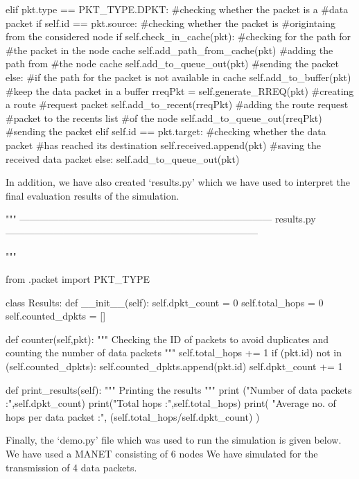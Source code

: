 \documentclass[a4paper,11pt]{article}%
\begin{document}
\begin{python}
		 elif pkt.type == PKT_TYPE.DPKT:  #checking whether the packet is a
																			#data packet
				 if self.id == pkt.source:    #checking whether the packet is
																			#origintaing from the considered node
						 if self.check_in_cache(pkt): #checking for the path for
																					#the packet in the node cache
								 self.add_path_from_cache(pkt)    #adding the path from
																									#the node cache
								 self.add_to_queue_out(pkt)   #sending the packet
						 else:    #if the path for the packet is not available in cache
								 self.add_to_buffer(pkt)  #keep the data packet in a buffer
								 rreqPkt = self.generate_RREQ(pkt)    #creating a route
																											#request packet
								 self.add_to_recent(rreqPkt)  #adding the route request
																							#packet to the recents list
																							#of the node
								 self.add_to_queue_out(rreqPkt)   #sending the packet
				 elif self.id == pkt.target:  #checking whether the data packet
																			#has reached its destination
						 self.received.append(pkt)    #saving the received data packet
				 else:
							self.add_to_queue_out(pkt)
\end{python}
\vspace{1cm}
In addition, we have also created ‘results.py’ which we have used to interpret the final evaluation results of the simulation.\\

\begin{python}
	"""
	    ------------------------------------------------------------------------------
	    results.py
	    ------------------------------------------------------------------------------

	"""

	from .packet import PKT_TYPE

	class Results:
	    def __init__(self):
	        self.dpkt_count = 0
	        self.total_hops = 0
	        self.counted_dpkts = []

	    def counter(self,pkt):
	        """
	        Checking the ID of packets to avoid duplicates
	        and counting the number of data packets
	        """
	        self.total_hops += 1
	        if (pkt.id) not in (self.counted_dpkts):
	            self.counted_dpkts.append(pkt.id)
	            self.dpkt_count += 1

	    def print_results(self):
	        """
	        Printing the results
	        """
	        print ("Number of data packets :",self.dpkt_count)
	        print("Total hops :",self.total_hops)
	        print(
	            "Average no. of hops per data packet :",
	            (self.total_hops/self.dpkt_count)
	            )
\end{python}
\pagebreak
Finally, the ‘demo.py’ file which was used to run the simulation is given below.
We have used a MANET consisting of 6 nodes
We have simulated for the transmission of 4 data packets.\\
\end{document}
